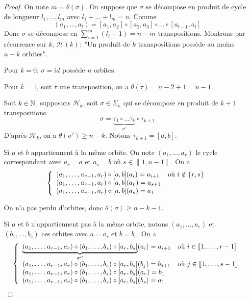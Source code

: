 \documentclass[12pt]{article}
\begin{document}
\begin{proof}
	On note $m=\theta(\sigma)$. On suppose que $\sigma$ se décompose en produit de cycle de longueur $l_{1},\dots,l_{m}$ avec $l_{1}+\dots+l_{m}=n$. Comme
	\begin{equation}
		(a_{1},\dots,a_{l})=[a_{1},a_{2}]\circ[a_{2},a_{3}]\circ\dots\circ[a_{l-1},a_{l}]
	\end{equation}
	Donc $\sigma$ se décompose en $\sum_{i=1}^{m}(l_{i}-1)=n-m$ transpositions. Montrons par récurrence sur $k$, $\mathcal{H}(k)\colon$ "Un produit de $k$ transpositions possède au moins $n-k$ orbites".

	Pour $k=0$, $\sigma=id$ possède $n$ orbites.

	Pour $k=1$, soit $\tau$ une transposition, on a $\theta(\tau)=n-2+1=n-1$.

	Soit $k\in\mathbb{N}$, supposons $\mathcal{H}_{k}$, soit $\sigma\in\Sigma_{n}$ qui se décompose en produit de $k+1$ transpositions.
	\begin{equation}
		\sigma=\underbrace{\tau_{1}\circ\dots\tau_{k}}_{\sigma'}\circ\tau_{k+1}
	\end{equation}
	D'après $\mathcal{H}_{k}$, on a $\theta(\sigma')\geqslant n-k$. Notons $\tau_{k+1}=[a,b]$. 
	
	Si $a$ et $b$ appartiennent à la même orbite. On note $(a_{1},\dots,a_{r})$ le cycle correspondant avec $a_{r}=a$ et $a_{s}=b$ où $s\in\left\llbracket 1,n-1\right\rrbracket$. On a 
	\begin{equation}
		\left\{
			\begin{array}[]{ll}
				(a_{1},\dots,a_{r-1},a_{r})\circ[a,b](a_{i})=a_{i+1} &\text{où }i\notin\{r,s\}\\
				(a_{1},\dots,a_{r-1},a_{r})\circ[a,b](a_{r})=a_{s+1}&\\
				(a_{1},\dots,a_{r-1},a_{r})\circ[a,b](a_{s})=a_{1}&
			\end{array}
		\right.
	\end{equation}
	
	On n'a pas perdu d'orbites, donc $\theta(\sigma)\geqslant n-k-1$. 

	Si $a$ et $b$ n'appartiennent pas à la même orbite, notons $(a_{1},\dots,a_{r})$ et $(b_{1},\dots,b_{s})$ ces orbites avec $a=a_{r}$ et $b=b_{s}$. On a 
	\begin{equation}
		\left\{
			\begin{array}[]{ll}
				\underbrace{(a_{1},\dots,a_{r-1},a_{r})\circ(b_{1},\dots,b_{s})\circ[a_{r},b_{s}]}_{\sigma''}(a_{i})=a_{i+1} &\text{où }i\in\left\llbracket 1,\dots,r-1\right\rrbracket\\
				(a_{1},\dots,a_{r-1},a_{r})\circ(b_{1},\dots,b_{s})\circ[a_{r},b_{s}](b_{j})=b_{j+1} &\text{où }j\in\left\llbracket 1,\dots,s-1\right\rrbracket\\
				(a_{1},\dots,a_{r-1},a_{r})\circ(b_{1},\dots,b_{s})\circ[a_{r},b_{s}](a_{r})=b_{1}&\\
				(a_{1},\dots,a_{r-1},a_{r})\circ(b_{1},\dots,b_{s})\circ[a_{r},b_{s}](b_{s})=a_{1}&
			\end{array}
		\right.	
	\end{equation}


\end{proof}
\end{document}

